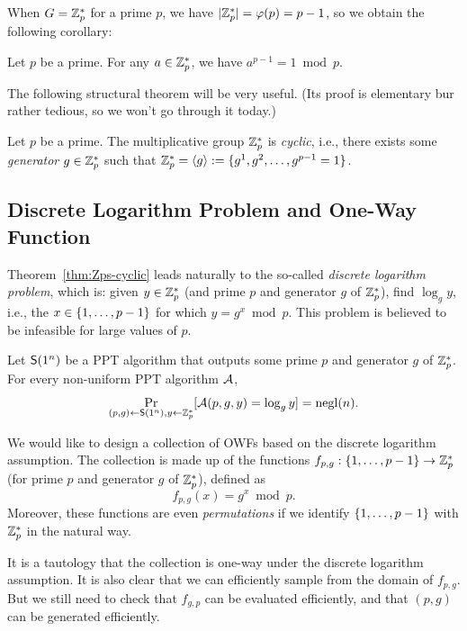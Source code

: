 \documentclass[11pt]{article}
\begin{document}
When $G = \mathbb{Z}_p^{*}$ for a prime $p$, we have $\lvert\mathbb{Z}_p^{*}\rvert =
\varphi(p) = p-1$, so we obtain the following corollary:

\begin{corollary}
  Let $p$ be a prime.  For any $a \in \mathbb{Z}_p^{*}$, we have $a^{p-1} = 1
  \bmod p$.
\end{corollary}

The following structural theorem will be very useful.  (Its proof is
elementary bur rather tedious, so we won't go through it today.)

\begin{theorem}
  \label{thm:Zps-cyclic}
  Let $p$ be a prime.  The multiplicative group $\mathbb{Z}_p^{*}$ is
  \emph{cyclic}, i.e., there exists some \emph{generator} $g \in
  \mathbb{Z}_p^{*}$ such that $\mathbb{Z}_p^{*} = \langle g \rangle := \{g^{1}, g^{2},
    \ldots, g^{p-1}=1\}$.
\end{theorem}

\subsection{Discrete Logarithm Problem and One-Way Function}
\label{sec:dlp-owf}

Theorem~\ref{thm:Zps-cyclic} leads naturally to the so-called
\emph{discrete logarithm problem}, which is: given $y \in \mathbb{Z}_p^{*}$
(and prime $p$ and generator $g$ of $\mathbb{Z}_p^{*}$), find $\log_{g} y$,
i.e., the $x \in \{1, \ldots, p-1\}$ for which $y = g^{x} \bmod p$.
This problem is believed to be infeasible for large values of $p$.

\begin{conjecture}
  Let $\mathsf{S}(1^{n})$ be a PPT algorithm that outputs some prime $p$
  and generator $g$ of $\mathbb{Z}_p^{*}$.  For every non-uniform PPT algorithm
  $\mathcal{A}$, \[ \Pr_{(p,g) \gets \mathsf{S}(1^{n}), y \gets \mathbb{Z}_p^{*}}
  [\mathcal{A}(p,g,y) = \log_{g} y] = \operatorname{negl}(n). \]
\end{conjecture}

We would like to design a collection of OWFs based on the discrete
logarithm assumption.  The collection is made up of the functions
$f_{p,g} : \{1, \ldots, p-1\} \to \mathbb{Z}_p^{*}$ (for prime $p$ and
generator $g$ of $\mathbb{Z}_p^{*}$), defined as \[ f_{p,g}(x) = g^{x} \bmod
p. \] Moreover, these functions are even \emph{permutations} if we
identify $\{1, \ldots, p-1\}$ with $\mathbb{Z}_p^{*}$ in the natural way.

It is a tautology that the collection is one-way under the discrete
logarithm assumption.  It is also clear that we can efficiently sample
from the domain of $f_{p,g}$.  But we still need to check that
$f_{g,p}$ can be evaluated efficiently, and that $(p,g)$ can be
generated efficiently.
\end{document}

